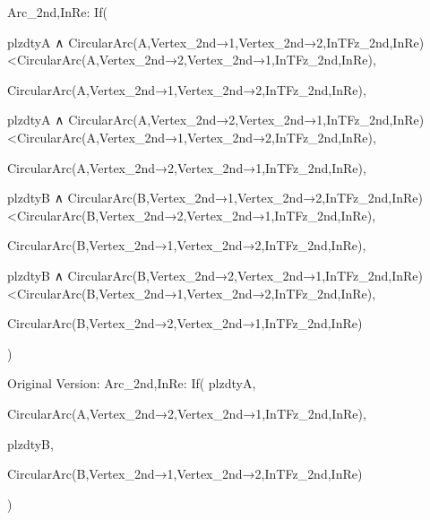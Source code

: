 Arc_{2nd,InRe}: 
  If(

    plzdtyA ∧ CircularArc(A,Vertex_{2nd→1},Vertex_{2nd→2},InTFz_{2nd,InRe})<CircularArc(A,Vertex_{2nd→2},Vertex_{2nd→1},InTFz_{2nd,InRe}),

    CircularArc(A,Vertex_{2nd→1},Vertex_{2nd→2},InTFz_{2nd,InRe}),

    plzdtyA ∧ CircularArc(A,Vertex_{2nd→2},Vertex_{2nd→1},InTFz_{2nd,InRe})<CircularArc(A,Vertex_{2nd→1},Vertex_{2nd→2},InTFz_{2nd,InRe}),

    CircularArc(A,Vertex_{2nd→2},Vertex_{2nd→1},InTFz_{2nd,InRe}),

    plzdtyB ∧ CircularArc(B,Vertex_{2nd→1},Vertex_{2nd→2},InTFz_{2nd,InRe})<CircularArc(B,Vertex_{2nd→2},Vertex_{2nd→1},InTFz_{2nd,InRe}),

    CircularArc(B,Vertex_{2nd→1},Vertex_{2nd→2},InTFz_{2nd,InRe}),

    plzdtyB ∧ CircularArc(B,Vertex_{2nd→2},Vertex_{2nd→1},InTFz_{2nd,InRe})<CircularArc(B,Vertex_{2nd→1},Vertex_{2nd→2},InTFz_{2nd,InRe}),
    
    CircularArc(B,Vertex_{2nd→2},Vertex_{2nd→1},InTFz_{2nd,InRe})
    
  )


Original Version:
Arc_{2nd,InRe}:
  If(
    plzdtyA,
    
    CircularArc(A,Vertex_{2nd→2},Vertex_{2nd→1},InTFz_{2nd,InRe}),
    
    plzdtyB,
    
    CircularArc(B,Vertex_{2nd→1},Vertex_{2nd→2},InTFz_{2nd,InRe})
    
  )